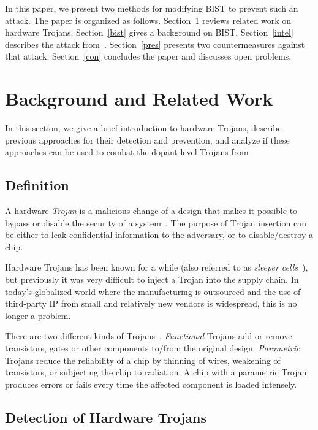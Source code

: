 \documentclass[a4paper]{llncs}
\begin{document}
In this paper, we present two methods for modifying BIST to prevent such an attack. 
The paper is organized as follows.
Section~\ref{ht} reviews related work on hardware Trojans. 
Section~\ref{bist} gives a background on BIST.
Section~\ref{intel} describes the attack from~\cite{BeRPB13}.
Section~\ref{pres} presents two countermeasures against that attack.
Section~\ref{con} concludes the paper and discusses open problems.

\section{Background and Related Work} \label{ht}

In this section, we give a brief introduction to hardware Trojans, describe previous approaches for their detection and prevention, and analyze if these approaches can be used to combat the dopant-level Trojans from~\cite{BeRPB13}.  

\subsection{Definition}

A hardware {\em Trojan} is a malicious change of a design that makes it possible to  
bypass or disable the security of a system~\cite{TeK10}.
The purpose of Trojan insertion can be either to leak confidential information to the adversary, or to disable/destroy a chip. 

Hardware Trojans has been known for a while (also referred to as {\em sleeper cells}~\cite{ht14}), but previously it was very difficult to inject a Trojan into the supply chain. In today's globalized world where the manufacturing is outsourced and the use of third-party IP from small and relatively new vendors is widespread, this is no longer a problem.


There are two different kinds of Trojans~\cite{TeK10}. 
{\em Functional} Trojans add or remove transistors, gates or other components to/from the original design.
{\em Parametric} Trojans reduce the reliability of a chip by thinning of wires, weakening of transistors, or subjecting the chip to radiation. A chip with a parametric Trojan produces errors or fails every time the affected component is loaded intensely. 

\subsection{Detection of Hardware Trojans}
\end{document}
